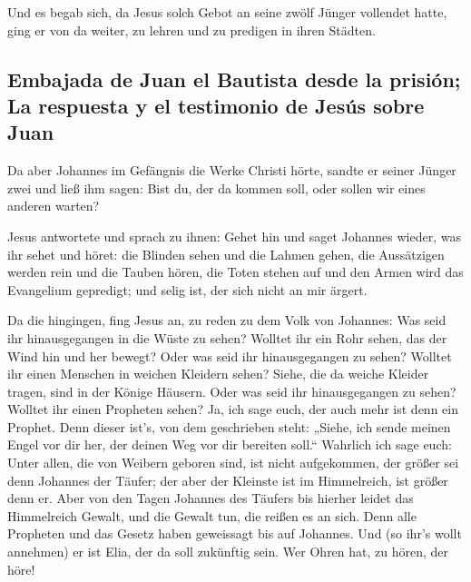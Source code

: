  Und es begab sich, da Jesus solch Gebot an seine zwölf
Jünger vollendet hatte, ging er von da weiter, zu lehren und zu predigen
in ihren Städten.

\hypertarget{embajada-de-juan-el-bautista-desde-la-prisiuxf3n-la-respuesta-y-el-testimonio-de-jesuxfas-sobre-juan}{%
\subsection{Embajada de Juan el Bautista desde la prisión; La respuesta
y el testimonio de Jesús sobre
Juan}\label{embajada-de-juan-el-bautista-desde-la-prisiuxf3n-la-respuesta-y-el-testimonio-de-jesuxfas-sobre-juan}}

 Da aber Johannes im Gefängnis die Werke Christi hörte,
sandte er seiner Jünger zwei  und ließ ihm sagen: Bist du,
der da kommen soll, oder sollen wir eines anderen warten?

 Jesus antwortete und sprach zu ihnen: Gehet hin und saget
Johannes wieder, was ihr sehet und höret:  die Blinden
sehen und die Lahmen gehen, die Aussätzigen werden rein und die Tauben
hören, die Toten stehen auf und den Armen wird das Evangelium gepredigt;
 und selig ist, der sich nicht an mir ärgert.

 Da die hingingen, fing Jesus an, zu reden zu dem Volk von
Johannes: Was seid ihr hinausgegangen in die Wüste zu sehen? Wolltet ihr
ein Rohr sehen, das der Wind hin und her bewegt?  Oder was
seid ihr hinausgegangen zu sehen? Wolltet ihr einen Menschen in weichen
Kleidern sehen? Siehe, die da weiche Kleider tragen, sind in der Könige
Häusern.  Oder was seid ihr hinausgegangen zu sehen?
Wolltet ihr einen Propheten sehen? Ja, ich sage euch, der auch mehr ist
denn ein Prophet.  Denn dieser ist's, von dem geschrieben
steht: „Siehe, ich sende meinen Engel vor dir her, der deinen Weg vor
dir bereiten soll.``  Wahrlich ich sage euch: Unter
allen, die von Weibern geboren sind, ist nicht aufgekommen, der größer
sei denn Johannes der Täufer; der aber der Kleinste ist im Himmelreich,
ist größer denn er.  Aber von den Tagen Johannes des
Täufers bis hierher leidet das Himmelreich Gewalt, und die Gewalt tun,
die reißen es an sich.  Denn alle Propheten und das
Gesetz haben geweissagt bis auf Johannes.  Und (so ihr's
wollt annehmen) er ist Elia, der da soll zukünftig sein. 
Wer Ohren hat, zu hören, der höre!

